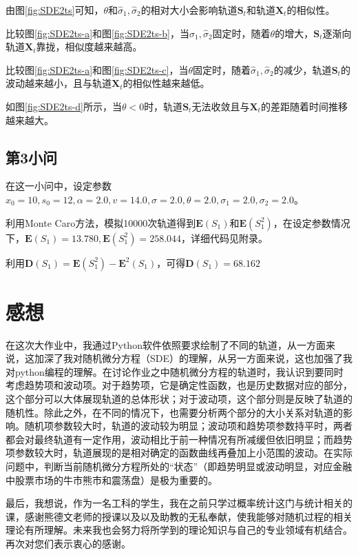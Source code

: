 \documentclass{article}
\begin{document}
由图\ref{fig:SDE2ts}可知，$\theta$和$\hat{\sigma}_1, \hat{\sigma}_2$的相对大小会影响轨道$\boldsymbol{S}_t$和轨道$\boldsymbol{X}_t$的相似性。

比较图\ref{fig:SDE2ts-a}和图\ref{fig:SDE2ts-b}，当$\hat{\sigma}_1, \hat{\sigma}_2$固定时，随着$\theta$的增大，$\boldsymbol{S}_t$逐渐向轨道$\boldsymbol{X}_t$靠拢，相似度越来越高。

比较图\ref{fig:SDE2ts-a}和图\ref{fig:SDE2ts-c}，当$\theta$固定时，随着$\hat{\sigma}_1, \hat{\sigma}_2$的减少，轨道$\boldsymbol{S}_t$的波动越来越小，且与轨道$\boldsymbol{X}_t$的相似性越来越低。

如图\ref{fig:SDE2ts-d}所示，当$\theta < 0$时，轨道$\boldsymbol{S}_t$无法收敛且与$\boldsymbol{X}_t$的差距随着时间推移越来越大。

\subsection{第3小问}

在这一小问中，设定参数$x_0 = 10, s_0 = 12,\alpha = 2.0, v = 14.0, \sigma = 2.0, \theta = 2.0, \sigma_1 =  2.0, \sigma_2 = 2.0$。

利用Monte Caro方法，模拟10000次轨道得到$\boldsymbol{E}(S_1)$和$\boldsymbol{E}(S_1^2)$，在设定参数情况下，$\boldsymbol{E}(S_1) = 13.780,\boldsymbol{E}(S_1^2) = 258.044$，详细代码见附录。

利用$\boldsymbol{D}(S_1) = \boldsymbol{E}(S_1^2) - \boldsymbol{E}^2(S_1)$，可得$\boldsymbol{D}(S_1) = 68.162$

\section{感想}

在这次大作业中，我通过Python软件依照要求绘制了不同的轨道，从一方面来说，这加深了我对随机微分方程（SDE）的理解，从另一方面来说，这也加强了我对python编程的理解。在讨论作业之中随机微分方程的轨道时，我认识到要同时考虑趋势项和波动项。对于趋势项，它是确定性函数，也是历史数据对应的部分，这个部分可以大体展现轨道的总体形状；对于波动项，这个部分则是反映了轨道的随机性。除此之外，在不同的情况下，也需要分析两个部分的大小关系对轨道的影响。随机项参数较大时，轨道的波动较为明显；波动项和趋势项参数持平时，两者都会对最终轨道有一定作用，波动相比于前一种情况有所减缓但依旧明显；而趋势项参数较大时，轨道展现的是相对确定的函数曲线再叠加上小范围的波动。在实际问题中，判断当前随机微分方程所处的“状态”（即趋势明显或波动明显，对应金融中股票市场的牛市熊市和震荡盘）是极为重要的。

最后，我想说，作为一名工科的学生，我在之前只学过概率统计这门与统计相关的课，感谢熊德文老师的授课以及以及助教的无私奉献，使我能够对随机过程的相关理论有所理解。未来我也会努力将所学到的理论知识与自己的专业领域有机结合。再次对您们表示衷心的感谢。
\end{document}
